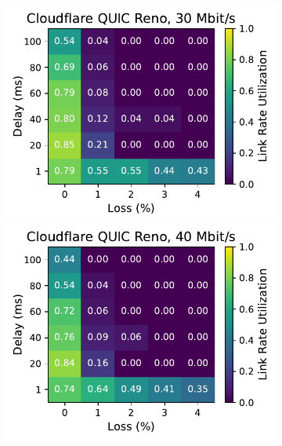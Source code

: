 \begin{figure}[ht]
\begin{subfigure}[b]{0.22\linewidth}
        \includegraphics[width=\linewidth,trim={0 0 2cm 0},clip]{splitting-paper/figures/heatmaps/heatmap_quiche_reno_30mbps.pdf}
        \includegraphics[width=\linewidth,trim={0 0 2cm 0},clip]{splitting-paper/figures/heatmaps/heatmap_quiche_reno_40mbps.pdf}

\end{subfigure}
\end{figure}
